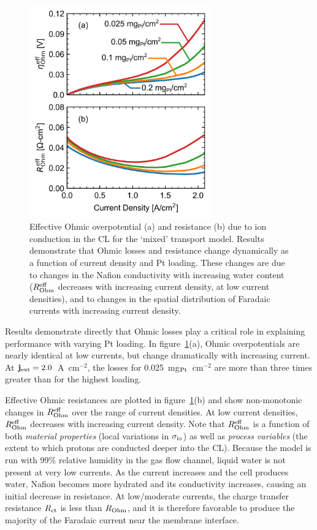 \documentclass[final,3p,times,twocolumn]{elsarticle}    %
\begin{document}
\begin{figure}[!tb]
    \centering
    \includegraphics[width=3.07in]{figures/effective-ohmic-plots-3_07in.png}
    \caption{Effective Ohmic overpotential (a) and resistance (b) due to ion conduction in the CL for the `mixed' transport model. Results demonstrate that Ohmic losses and resistance change dynamically as a function of current density and Pt loading. These changes are due to changes in the Nafion conductivity with increasing water content ($R_{\rm Ohm}^{\rm eff}$ decreases with increasing current density, at low current densities), and to changes in the spatial distribution of Faradaic currents with increasing current density.}
    \label{fig:effective-Ohmic-measures}
\end{figure}

Results demonstrate directly that Ohmic losses play a critical role in explaining performance with varying Pt loading. In figure~\ref{fig:effective-Ohmic-measures}(a), Ohmic overpotentials are nearly identical at low currents, but change dramatically with increasing current. At ${\bf j}_{\rm ext} = 2.0$~A~cm$^{-2}$, the losses for 0.025~mg$_{\rm Pt}$~cm$^{-2}$ are more than three times greater than for the highest loading.  

Effective Ohmic resistances are plotted in figure~\ref{fig:effective-Ohmic-measures}(b) and show non-monotonic changes in $R_{\rm Ohm}^{\rm eff}$ over the range of current densities. At low current densities, $R_{\rm Ohm}^{\rm eff}$ decreases with increasing current density. Note that $R_{\rm Ohm}^{\rm eff}$ is a function of both \emph{material properties} (local variations in $\sigma_{\rm io}$) as well as \emph{process variables} (the extent to which protons are conducted deeper into the CL). Because the model is run with 99\% relative humidity in the gas flow channel, liquid water is not present at very low currents. As the current increases and the cell produces water, Nafion becomes more hydrated and its conductivity increases, causing an initial decrease in resistance. At low/moderate currents, the charge transfer resistance $R_{\rm ct}$ is less than $R_{\rm Ohm}$, and it is therefore favorable to produce the majority of the Faradaic current near the membrane interface. 
\end{document}
